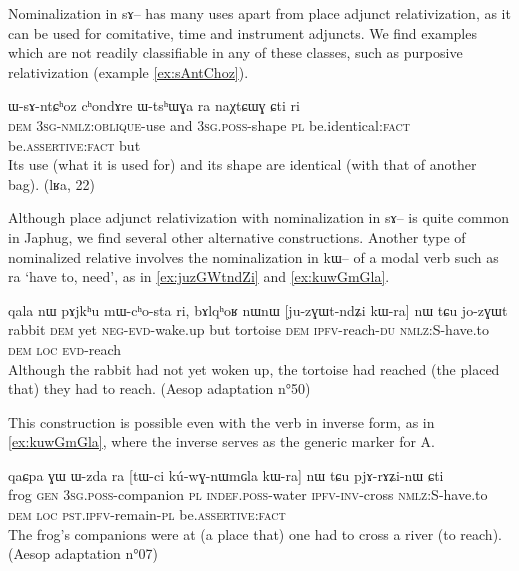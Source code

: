 \documentclass[oldfontcommands,oneside,a4paper,11pt]{article}
\newcommand{\ipa}[1]{{\phon #1}} %
\newcommand{\topic}{\textsc{dem}}
\begin{document}
Nominalization in \ipa{sɤ}-- has many uses apart from place adjunct relativization, as it can be used for comitative, time and instrument adjuncts. We find examples which are not readily classifiable in any of these classes, such as purposive relativization (example \ref{ex:sAntChoz}).  

     \begin{exe}
  \ex   \label{ex:sAntChoz}  
\gll \ipa{nɯnɯ}  	\ipa{ɯ-sɤ-ntɕʰoz}  	\ipa{cʰondɤre}  	\ipa{ɯ-tsʰɯɣa}  	\ipa{ra}  	\ipa{naχtɕɯɣ}  	\ipa{ɕti}  	\ipa{ri}  	\\
\textsc{dem} \textsc{3sg-nmlz:oblique}-use and \textsc{3sg.poss}-shape \textsc{pl} be.identical:\textsc{fact} be.\textsc{assertive}:\textsc{fact} but \\
\glt  Its use (what it is used for) and its shape are identical (with that of another bag). (lʁa, 22)
   \end{exe} 


Although place adjunct relativization with nominalization in \ipa{sɤ}-- is quite common in Japhug, we find several other alternative constructions. Another type of nominalized relative involves the nominalization in \ipa{kɯ}-- of a modal verb such as \ipa{ra} `have to, need', as in  \ref{ex:juzGWtndZi} and \ref{ex:kuwGmGla}.

\begin{exe}
   \ex \label{ex:juzGWtndZi}
 \gll
\ipa{qala}   	\ipa{nɯ}   	\ipa{pɤjkʰu}   	\ipa{mɯ-cʰo-sta}   	\ipa{ri,}   	\ipa{bɤlqʰoʁ}   	\ipa{nɯnɯ}   	[\ipa{ju-zɣɯt-ndʑi}   	\ipa{kɯ-ra}]   	\ipa{nɯ} \ipa{tɕu}   	\ipa{jo-zɣɯt}   \\
rabbit \topic{} yet \textsc{neg-evd}-wake.up but tortoise \topic{} \textsc{ipfv}-reach-\textsc{du} \textsc{nmlz:S}-have.to \topic{} \textsc{loc} \textsc{evd}-reach \\
\glt Although the rabbit had not yet woken up, the tortoise had reached (the placed that) they had to reach.
(Aesop adaptation n°50)
\end{exe}

This construction is possible even with the verb in inverse form, as in \ref{ex:kuwGmGla}, where the inverse serves as the generic marker for A.
\begin{exe}
   \ex \label{ex:kuwGmGla}
 \gll
\ipa{qaɕpa}   	\ipa{ɣɯ}   	\ipa{ɯ-zda}   	\ipa{ra}   	[\ipa{tɯ-ci}   	\ipa{kú-wɣ-nɯmɢla}   	\ipa{kɯ-ra}]   	\ipa{nɯ} \ipa{tɕu}   	\ipa{pjɤ-rɤʑi-nɯ}   	\ipa{ɕti}   \\
frog \textsc{gen}  \textsc{3sg.poss}-companion \textsc{pl} \textsc{indef.poss}-water \textsc{ipfv-inv}-cross \textsc{nmlz:S}-have.to \topic{} \textsc{loc} \textsc{pst.ipfv}-remain-\textsc{pl} be.\textsc{assertive}:\textsc{fact} \\
\glt The frog's companions were at (a place that) one had to cross a river (to reach). (Aesop adaptation n°07)
\end{exe}
\end{document}
